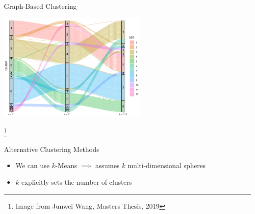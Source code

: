 \documentclass[aspectratio=169,11pt]{beamer}
\newcommand\blfootnote[1]{%
  \begingroup
  \renewcommand\thefootnote{}\footnote{#1}%
  \addtocounter{footnote}{-1}%
  \endgroup
}
\begin{document}
\begin{frame}{Graph-Based Clustering}

	\begin{center}
		\includegraphics[width=0.55\textwidth]{figures/junweiAlluvial.png} 
	\end{center}
	
	\blfootnote{Image from Junwei Wang, Masters Thesis, 2019}

\end{frame}

\begin{frame}{Alternative Clustering Methods}
	\begin{itemize}
		\item We can use $k$-Means $\implies$ assumes $k$ multi-dimensional spheres
		\item $k$ explicitly sets the number of clusters
	\end{itemize}
	
\end{frame}
\end{document}
